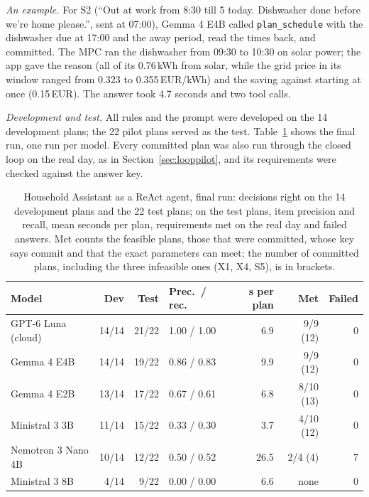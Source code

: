 \documentclass[12pt,a4paper]{report}
\begin{document}
\textit{An example.} For S2 (``Out at work from 8:30 till 5 today.
Dishwasher done before we're home please.'', sent at 07:00), Gemma 4
E4B called \texttt{plan\_schedule} with the dishwasher due at 17:00 and
the away period, read the times back, and committed. The MPC ran the
dishwasher from 09:30 to 10:30 on solar power; the app gave the reason
(all of its 0.76\,kWh from solar, while the grid price in its window
ranged from 0.323 to 0.355\,EUR/kWh) and the saving against starting at
once (0.15\,EUR). The answer took 4.7 seconds and two tool calls.

\textit{Development and test.} All rules and the prompt were developed
on the 14 development plans; the 22 pilot plans served as the test.
Table~\ref{tab:reactgateway} shows the final run, one run per model.
Every committed plan was also run through the closed loop on the real
day, as in Section~\ref{sec:looppilot}, and its requirements were
checked against the answer key.

\begin{table}[htbp]
\caption{Household Assistant as a ReAct agent, final run: decisions
right on the 14 development plans and the 22 test plans; on the test
plans, item precision and recall, mean seconds per plan, requirements
met on the real day and failed answers. Met counts the feasible plans,
those that were committed, whose key says commit and that the exact
parameters can meet; the number of committed plans, including the three
infeasible ones (X1, X4, S5), is in brackets.}
\label{tab:reactgateway}
\small
\begin{tabularx}{\textwidth}{@{}Xrrlrrr@{}}
\toprule
Model & Dev & Test & Prec.\ / rec. & s per plan & Met & Failed \\
\midrule
GPT-6 Luna (cloud) & 14/14 & 21/22 & 1.00 / 1.00 & 6.9 & 9/9 (12) & 0 \\
Gemma 4 E4B & 14/14 & 19/22 & 0.86 / 0.83 & 9.9 & 9/9 (12) & 0 \\
Gemma 4 E2B & 13/14 & 17/22 & 0.67 / 0.61 & 6.8 & 8/10 (13) & 0 \\
Ministral 3 3B & 11/14 & 15/22 & 0.33 / 0.30 & 3.7 & 4/10 (12) & 0 \\
Nemotron 3 Nano 4B & 10/14 & 12/22 & 0.50 / 0.52 & 26.5 & 2/4 (4) & 7 \\
Ministral 3 8B & 4/14 & 9/22 & 0.00 / 0.00 & 6.6 & none & 0 \\
\bottomrule
\end{tabularx}
\end{table}
\end{document}
